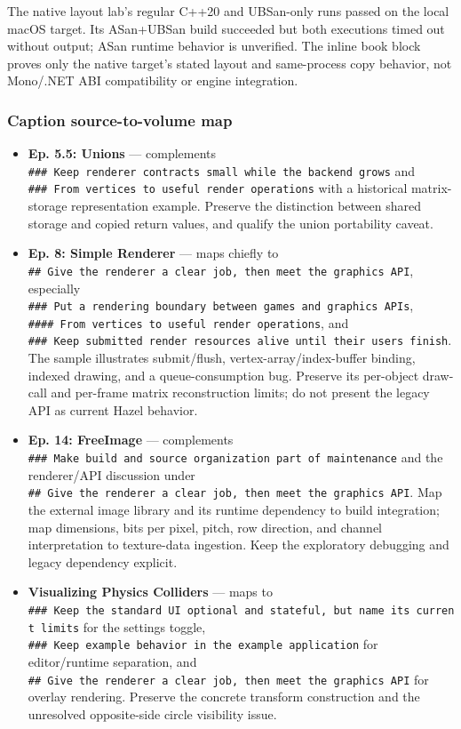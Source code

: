 The native layout lab's regular C++20 and UBSan-only runs passed on the local macOS target. Its ASan+UBSan build succeeded but both executions timed out without output; ASan runtime behavior is unverified. The inline book block proves only the native target's stated layout and same-process copy behavior, not Mono/.NET ABI compatibility or engine integration.

\subsubsection{Caption source-to-volume map}\label{appendix-877738f6f4d2-caption-source-to-volume-map}

\begin{itemize}
\tightlist
\item
  \textbf{Ep. 5.5: Unions} --- complements \texttt{\#\#\#\ Keep\ renderer\ contracts\ small\ while\ the\ backend\ grows} and \texttt{\#\#\#\ From\ vertices\ to\ useful\ render\ operations} with a historical matrix-storage representation example. Preserve the distinction between shared storage and copied return values, and qualify the union portability caveat.
\item
  \textbf{Ep. 8: Simple Renderer} --- maps chiefly to \texttt{\#\#\ Give\ the\ renderer\ a\ clear\ job,\ then\ meet\ the\ graphics\ API}, especially \texttt{\#\#\#\ Put\ a\ rendering\ boundary\ between\ games\ and\ graphics\ APIs}, \texttt{\#\#\#\#\ From\ vertices\ to\ useful\ render\ operations}, and \texttt{\#\#\#\ Keep\ submitted\ render\ resources\ alive\ until\ their\ users\ finish}. The sample illustrates submit/flush, vertex-array/index-buffer binding, indexed drawing, and a queue-consumption bug. Preserve its per-object draw-call and per-frame matrix reconstruction limits; do not present the legacy API as current Hazel behavior.
\item
  \textbf{Ep. 14: FreeImage} --- complements \texttt{\#\#\#\ Make\ build\ and\ source\ organization\ part\ of\ maintenance} and the renderer/API discussion under \texttt{\#\#\ Give\ the\ renderer\ a\ clear\ job,\ then\ meet\ the\ graphics\ API}. Map the external image library and its runtime dependency to build integration; map dimensions, bits per pixel, pitch, row direction, and channel interpretation to texture-data ingestion. Keep the exploratory debugging and legacy dependency explicit.
\item
  \textbf{Visualizing Physics Colliders} --- maps to \texttt{\#\#\#\ Keep\ the\ standard\ UI\ optional\ and\ stateful,\ but\ name\ its\ current\ limits} for the settings toggle, \texttt{\#\#\#\ Keep\ example\ behavior\ in\ the\ example\ application} for editor/runtime separation, and \texttt{\#\#\ Give\ the\ renderer\ a\ clear\ job,\ then\ meet\ the\ graphics\ API} for overlay rendering. Preserve the concrete transform construction and the unresolved opposite-side circle visibility issue.

\end{itemize}
